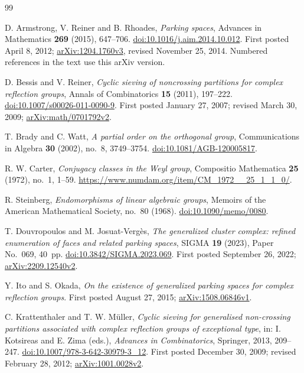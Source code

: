 \documentclass[11pt]{article}
\begin{document}
\begin{thebibliography}{99}

D. Armstrong, V. Reiner and B. Rhoades,
\emph{Parking spaces},
Advances in Mathematics \textbf{269} (2015), 647--706.
\href{https://doi.org/10.1016/j.aim.2014.10.012}{doi:10.1016/j.aim.2014.10.012}.
First posted April 8, 2012;
\href{https://arxiv.org/abs/1204.1760v3}{arXiv:1204.1760v3},
revised November 25, 2014. Numbered references in the text use this
arXiv version.

D. Bessis and V. Reiner,
\emph{Cyclic sieving of noncrossing partitions for complex reflection groups},
Annals of Combinatorics \textbf{15} (2011), 197--222.
\href{https://doi.org/10.1007/s00026-011-0090-9}{doi:10.1007/s00026-011-0090-9}.
First posted January 27, 2007; revised March 30, 2009;
\href{https://arxiv.org/abs/math/0701792v2}{arXiv:math/0701792v2}.

T. Brady and C. Watt,
\emph{A partial order on the orthogonal group},
Communications in Algebra \textbf{30} (2002), no.~8, 3749--3754.
\href{https://doi.org/10.1081/AGB-120005817}{doi:10.1081/AGB-120005817}.

R. W. Carter,
\emph{Conjugacy classes in the Weyl group},
Compositio Mathematica \textbf{25} (1972), no.~1, 1--59.
\url{https://www.numdam.org/item/CM_1972__25_1_1_0/}.

R. Steinberg,
\emph{Endomorphisms of linear algebraic groups},
Memoirs of the American Mathematical Society, no.~80 (1968).
\href{https://doi.org/10.1090/memo/0080}{doi:10.1090/memo/0080}.

T. Douvropoulos and M. Josuat-Verg\`es,
\emph{The generalized cluster complex: refined enumeration of faces and
related parking spaces},
SIGMA \textbf{19} (2023), Paper No.~069, 40~pp.
\href{https://doi.org/10.3842/SIGMA.2023.069}{doi:10.3842/SIGMA.2023.069}.
First posted September 26, 2022;
\href{https://arxiv.org/abs/2209.12540v2}{arXiv:2209.12540v2}.

Y. Ito and S. Okada,
\emph{On the existence of generalized parking spaces for complex
reflection groups}.
First posted August 27, 2015;
\href{https://arxiv.org/abs/1508.06846v1}{arXiv:1508.06846v1}.

C. Krattenthaler and T. W. M\"uller,
\emph{Cyclic sieving for generalised non-crossing partitions associated
with complex reflection groups of exceptional type},
in: I. Kotsireas and E. Zima (eds.), \emph{Advances in Combinatorics},
Springer, 2013, 209--247.
\href{https://doi.org/10.1007/978-3-642-30979-3_12}{doi:10.1007/978-3-642-30979-3\_12}.
First posted December 30, 2009; revised February 28, 2012;
\href{https://arxiv.org/abs/1001.0028v2}{arXiv:1001.0028v2}.


\end{thebibliography}
\end{document}
